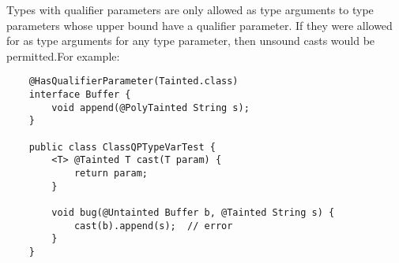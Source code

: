 Types with qualifier parameters are only allowed as type arguments to type parameters whose upper bound
have a qualifier parameter. If they were allowed for as type arguments for any type parameter, then
unsound casts would be permitted.For example:

\begin{Verbatim}
    @HasQualifierParameter(Tainted.class)
    interface Buffer {
        void append(@PolyTainted String s);
    }

    public class ClassQPTypeVarTest {
        <T> @Tainted T cast(T param) {
            return param;
        }

        void bug(@Untainted Buffer b, @Tainted String s) {
            cast(b).append(s);  // error
        }
    }


\end{Verbatim}

